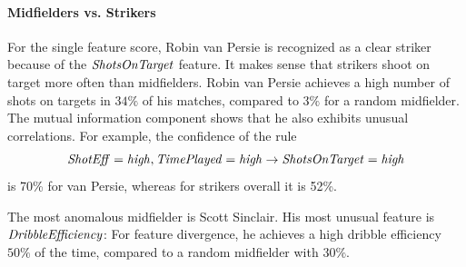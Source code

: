 \documentclass[conference]{IEEEtran}
\begin{document}
								\paragraph{Midfielders vs. Strikers} 
								
								For the single feature score, Robin van Persie is recognized as a clear striker because of the $\it{ShotsOnTarget}$ feature. It makes sense that strikers shoot on target more often than midfielders. Robin van Persie  achieves a high number of shots on targets in $34\%$ of his matches, compared to $3\%$ for a random midfielder. The mutual information component shows that he also exhibits  unusual correlations. For example, 
								the confidence of the rule
								$$\it{ShotEff} = \it{high}, \it{TimePlayed} = \it{high} \rightarrow \it{ShotsOnTarget} = \it{high}$$
								is 70\% for van Persie, whereas for strikers overall it is 52\%.
								
The most anomalous midfielder is Scott Sinclair. His most unusual feature is $\it{DribbleEfficiency}$: For feature divergence, he achieves a high dribble efficiency $50\%$ of the time, compared to a random midfielder with $30\%$. 
\end{document}
